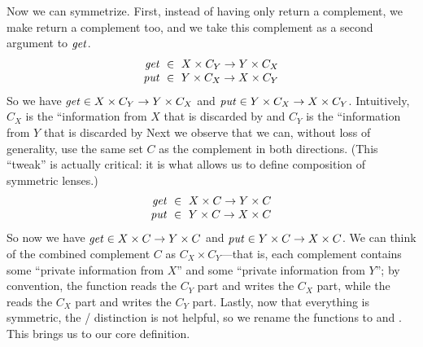 %
Now we can symmetrize.  
First, instead of having only \GET{} return a complement, we make \PUT{}
return a complement too, and we take this complement as a second argument
to $\mathit{get}$.
%
\iffull
\[
\begin{array}{r@{\ \;}c@{\ \;}l}
\GET &\in& X \times C_Y \arrow Y \times C_X\\
\PUT &\in& Y \times C_X \arrow X \times C_Y
\end{array}
\]
\else
So we have $\mathit{get} \in X \times C_Y \rightarrow Y \times C_X$ and 
$\mathit{put} \in Y \times C_X \rightarrow X \times C_Y$.
\fi
%
Intuitively, $C_X$ is the ``information from $X$ that is discarded by
\GET\commaquote and $C_Y$ is the ``information from $Y$ that is discarded by
\PUT\dotquote Next we observe that we can, without loss of generality, use the
same set $C$ as the complement in both directions.  \iffull (This ``tweak''
is actually critical: it is what allows us to define composition of symmetric
lenses.)\fi
\iffull
\[
\begin{array}{r@{\ \;}c@{\ \;}l}
\GET &\in& X \times C \arrow Y \times C\\
\PUT &\in& Y \times C \arrow X \times C
\end{array}
\]
\else
So now we have 
$\mathit{get} \in X \times C \rightarrow Y \times C$ and
$\mathit{put} \in Y \times C \rightarrow X \times C$.
\fi
%
We can think of the combined complement $C$ as $C_X \times
C_Y$---that is, each complement contains some ``private information from
$X$'' and some ``private information from $Y$''; by convention, the \GET{}
function reads the $C_Y$ part and writes the $C_X$ part, while the \PUT{}
reads the $C_X$ part and writes the $C_Y$ part.  
%
Lastly, now that everything is symmetric, the \GET{} / \PUT{} distinction is not
helpful, so we rename the functions to \PUTR{} and \PUTL.  This brings us to
our core definition.

